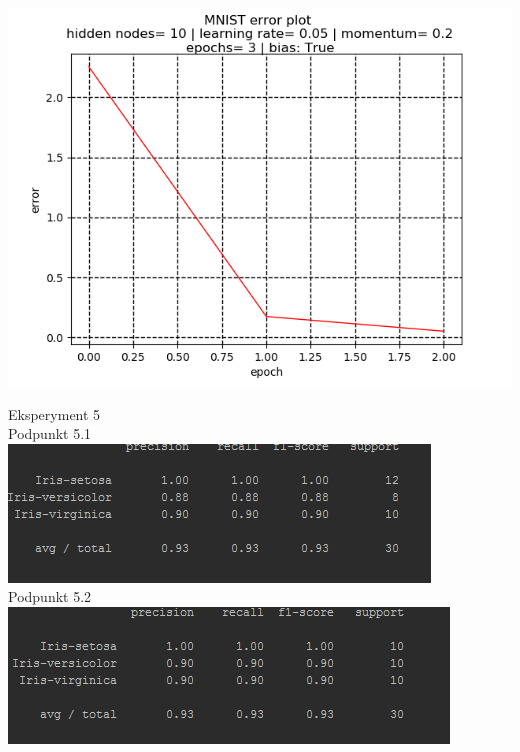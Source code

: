 \documentclass{classrep}
\begin{document}
{\includegraphics{imgs/MNIST22.png}\\
}

{Eksperyment 5\\
Podpunkt 5.1\\
\includegraphics{imgs/KNN11.png}\\
Podpunkt 5.2\\
\includegraphics{imgs/KNN21.png}\\
}
\end{document}
